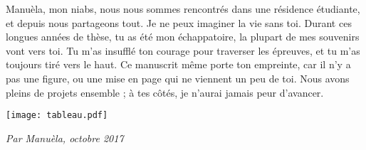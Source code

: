 Manu\`ela, mon niabs, nous nous sommes rencontr\'es dans une r\'esidence \'etudiante, et depuis nous partageons tout. Je ne peux imaginer la vie sans toi. Durant ces longues ann\'ees de th\`ese, tu as \'et\'e mon \'echappatoire, la plupart de mes souvenirs vont vers toi. Tu m'as insuffl\'e ton courage pour traverser les \'epreuves, et tu m'as toujours tir\'e vers le haut. Ce manuscrit m\^eme porte ton empreinte, car il n'y a pas une figure, ou une mise en page qui ne viennent un peu de toi. Nous avons pleins de projets ensemble ; \`a tes c\^ot\'es, je n'aurai jamais peur d'avancer.

\begin{figurehere}
\centering
\texttt{[image: tableau.pdf]}
\caption*{\small{\textit{Par Manu\`ela, octobre 2017}}}
\end{figurehere}




